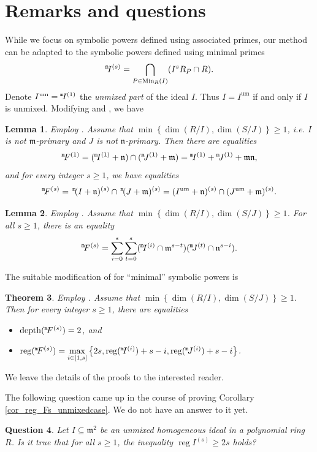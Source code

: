 \documentclass{amsart}
\DeclareMathOperator{\Min}{Min}
\DeclareMathOperator{\reg}{reg}
\DeclareMathOperator{\um}{um}
\newcommand{\mm}{\mathfrak{m}}
\newcommand{\nn}{\mathfrak{n}}
\theoremstyle{plain}
\newtheorem{thm}{Theorem}[section]
\newtheorem{lem}[thm]{Lemma}
\newtheorem{quest}[thm]{Question}
\theoremstyle{definition}
\numberwithin{equation}{section}
\newcommand{\up}[1]{{}^{\tt #1}\!}
\begin{document}
\section{Remarks and questions}
\label{sect_remarks}
While we focus on symbolic powers defined using associated primes, our method can be adapted to the symbolic powers defined using minimal primes
\[
\up{m}I^{(s)}=\bigcap\limits_{P \in \Min_R(I)}(I^sR_P\cap R).
\]
Denote $I^{\um}=\up{m}I^{(1)}$ the \emph{unmixed part} of the ideal $I$. Thus $I=I^{\um}$ if and only if $I$ is unmixed. Modifying  and , we have
\begin{lem} 
\label{lem_decomposition_minsymbpow}
Employ . Assume that $\min\left\{\dim(R/I), \dim(S/J)\right\}\ge 1$, i.e. $I$ is not $\mm$-primary and $J$ is not $\nn$-primary. Then there are equalities
\[
\up{m}F^{(1)}=(\up{m}I^{(1)}+\nn)\cap (\up{m}J^{(1)}+\mm)=\up{m}I^{(1)}+\up{m}J^{(1)}+\mm\nn,
\]
and for every integer $s\ge 1$, we have equalities
$$
\up{m}F^{(s)} = \, \up{m}(I+\nn)^{(s)} \cap \, \up{m}(J+\mm)^{(s)}=(I^{\um}+\nn)^{(s)}\cap (J^{\um}+\mm)^{(s)}.
$$
\end{lem}
\begin{lem}
\label{lem_decomposition_as_sum_minsymbpow}
Employ . Assume that $\min\left\{\dim(R/I),\dim(S/J)\right \}\ge 1$. For all $s\ge 1$, there is an equality
\[
\up{m}F^{(s)}= \sum_{i=0}^{s}\sum_{t=0}^{s}(\up{m}I^{(i)}\cap \mm^{s-t})(\up{m}J^{(t)}\cap \nn^{s-i}).
\]
\end{lem}
The suitable modification of  for ``minimal'' symbolic powers is
\begin{thm} 
\label{thm_depth_reg_minsymbpow}
Employ . Assume that $\min\left\{\dim(R/I), \dim(S/J)\right\}\ge 1$. Then for every integer $s\geq 1$, there are equalities
\begin{itemize}
\item[(i)] ${\rm depth}(\up{m}F^{(s)})=2$, and
\item[(ii)] ${\rm reg}(\up{m}F^{(s)})=\max\limits_{i\in [1,s]}\left\{2s,\reg(\up{m}I^{(i)})+s-i, {\rm reg}(\up{m}J^{(i)})+s-i \right\}$.
\end{itemize}
\end{thm}
We leave the details of the proofs to the interested reader.

The following question came up in the course of proving Corollary \ref{cor_reg_Fs_unmixedcase}. We do not have an answer to it yet.
\begin{quest}
Let $I\subseteq \mm^2$ be an unmixed homogeneous ideal in a polynomial ring $R$. Is it true that for all $s\ge 1$, the inequality
$\reg I^{(s)}\ge 2s$ holds?
\end{quest}
\end{document}

